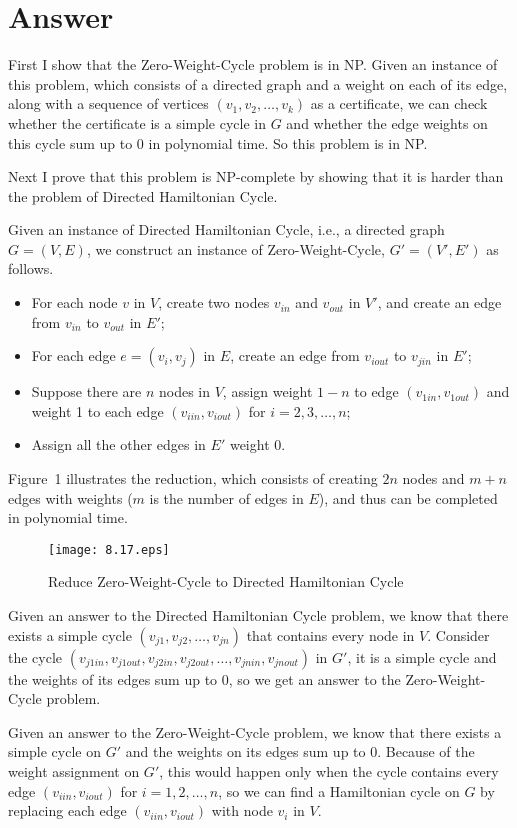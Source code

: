\documentclass[12pt,letterpaper]{article}
\begin{document}
\section*{Answer}
First I show that the Zero-Weight-Cycle problem is in NP. Given an instance of this problem, which consists of a directed graph and a weight on each of its edge, along with a sequence of vertices $(v_1, v_2, \dots, v_k)$ as a certificate, we can check whether the certificate is a simple cycle in $G$ and whether the edge weights on this cycle sum up to 0 in polynomial time. So this problem is in NP.

Next I prove that this problem is NP-complete by showing that it is harder than the problem of Directed Hamiltonian Cycle.

Given an instance of Directed Hamiltonian Cycle, i.e., a directed graph $G=(V,E)$, we construct an instance of Zero-Weight-Cycle, $G'=(V',E')$ as follows.
\begin{itemize}
\item For each node $v$ in $V$, create two nodes $v_{in}$ and $v_{out}$ in $V'$, and create an edge from $v_{in}$ to $v_{out}$ in $E'$;
\item For each edge $e=(v_i,v_j)$ in $E$, create an edge from $v_{iout}$ to $v_{jin}$ in $E'$;
\item Suppose there are $n$ nodes in $V$, assign weight $1-n$ to edge $(v_{1in}, v_{1out})$ and weight 1 to each edge $(v_{iin}, v_{iout})$ for $i=2, 3, \dots, n$;
\item Assign all the other edges in $E'$ weight 0.
\end{itemize}
Figure~1 illustrates the reduction, which consists of creating $2n$ nodes and $m+n$ edges with weights ($m$ is the number of edges in $E$), and thus can be completed in polynomial time.
\begin{figure}
\begin{center}
\texttt{[image: 8.17.eps]}
\caption{Reduce Zero-Weight-Cycle to Directed Hamiltonian Cycle}
\end{center}
\end{figure}

Given an answer to the Directed Hamiltonian Cycle problem, we know that there exists a simple cycle $(v_{j1}, v_{j2}, \dots, v_{jn})$ that contains every node in $V$. Consider the cycle $(v_{j1in}, v_{j1out}, v_{j2in}, v_{j2out}, \dots, v_{jnin}, v_{jnout})$ in $G'$, it is a simple cycle and the weights of its edges sum up to 0, so we get an answer to the Zero-Weight-Cycle problem.

Given an answer to the Zero-Weight-Cycle problem, we know that there exists a simple cycle on $G'$ and the weights on its edges sum up to 0. Because of the weight assignment on $G'$, this would happen only when the cycle contains every edge $(v_{iin}, v_{iout})$ for $i=1,2,\dots,n$, so we can find a Hamiltonian cycle on $G$ by replacing each edge $(v_{iin}, v_{iout})$ with node $v_i$ in $V$.
\end{document}
